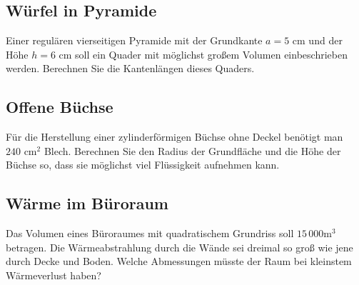 
\subsection{Würfel in Pyramide}
Einer regulären vierseitigen Pyramide mit der Grundkante $a = 5$ cm und der Höhe $h = 6$ cm
soll ein Quader mit möglichst großem Volumen einbeschrieben werden.
Berechnen Sie die Kantenlängen dieses Quaders.


\subsection{Offene Büchse}
Für die Herstellung einer zylinderförmigen Büchse ohne Deckel benötigt
man $240 \text{ cm}^2$ Blech. Berechnen Sie den Radius der Grundfläche und die Höhe der Büchse so, dass sie möglichst viel Flüssigkeit aufnehmen kann.





\subsection{Wärme im Büroraum}

Das Volumen eines Büroraumes mit quadratischem Grundriss soll $15\,000 \text{m}^3$ betragen. Die Wärmeabstrahlung durch die Wände sei dreimal so groß wie jene durch Decke und Boden. Welche Abmessungen müsste der Raum bei kleinstem Wärmeverlust haben?



